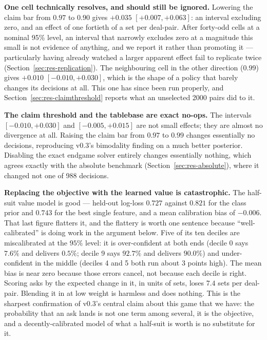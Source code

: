 \documentclass[11pt,letterpaper]{article}
\begin{document}
\textbf{One cell technically resolves, and should still be ignored.} Lowering
the claim bar from $0.97$ to $0.90$ gives $+0.035$ $[+0.007, +0.063]$: an
interval excluding zero, and an effect of one fortieth of a set per deal-pair.
After forty-odd cells at a nominal 95\% level, an interval that narrowly
excludes zero at a magnitude this small is not evidence of anything, and we
report it rather than promoting it --- particularly having already watched a
larger apparent effect fail to replicate twice
(Section~\ref{sec:res-replication}). The neighbouring cell in the other
direction ($0.99$) gives $+0.010$ $[-0.010, +0.030]$, which is the shape of a
policy that barely changes its decisions at all. This one has since been run
properly, and Section~\ref{sec:res-claimthreshold} reports what an unselected
2000 pairs did to it.

\textbf{The claim threshold and the tablebase are exact no-ops.} The intervals
$[-0.010, +0.030]$ and $[-0.005, +0.015]$ are not small effects; they are almost
no divergence at all. Raising the claim bar from $0.97$ to $0.99$ changes
essentially no decisions, reproducing v0.3's bimodality finding on a much better
posterior. Disabling the exact endgame solver entirely changes essentially
nothing, which agrees exactly with the absolute benchmark
(Section~\ref{sec:res-absolute}), where it changed not one of 988 decisions.

\textbf{Replacing the objective with the learned value is catastrophic.} The
half-suit value model is good --- held-out log-loss $0.727$ against $0.821$ for
the class prior and $0.743$ for the best single feature, and a mean calibration
bias of $-0.006$. That last figure flatters it, and the flattery is worth one
sentence because ``well-calibrated'' is doing work in the argument below. Five
of its ten deciles are miscalibrated at the $95\%$ level: it is over-confident
at both ends (decile 0 says $7.6\%$ and delivers $0.5\%$; decile 9 says $92.7\%$
and delivers $90.0\%$) and under-confident in the middle (deciles 4 and 5 both
run about $3$ points high). The mean bias is near zero because those errors
cancel, not because each decile is right. Scoring asks by the expected change in
it, in units of sets, loses $7.4$ sets per deal-pair. Blending it in at low
weight is harmless and does nothing. This is the sharpest confirmation of v0.3's
central claim about this game that we have: the probability that an ask lands is
not one term among several, it is the objective, and a decently-calibrated model of
what a half-suit is worth is no substitute for it.
\end{document}
